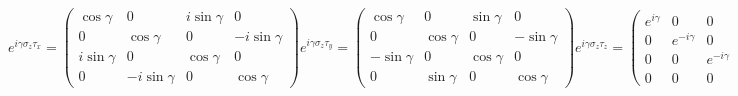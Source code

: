 \documentclass[12pt]{extarticle}
\begin{document}
\begin{equation*}
e^{i\gamma\sigma_z\tau_x}=
\begin{pmatrix}
    \cos\gamma & 0 & i\sin\gamma & 0 \\
    0 & \cos\gamma & 0 & -i\sin\gamma \\
    i\sin\gamma & 0 & \cos\gamma & 0 \\
    0 & -i\sin\gamma & 0 & \cos\gamma
\end{pmatrix}
e^{i\gamma\sigma_z\tau_y}=
\begin{pmatrix}
    \cos\gamma & 0 & \sin\gamma & 0 \\
    0 & \cos\gamma & 0 & -\sin\gamma \\
    -\sin\gamma & 0 & \cos\gamma & 0 \\
    0 & \sin\gamma & 0 & \cos\gamma
\end{pmatrix}
e^{i\gamma\sigma_z\tau_z}=
\begin{pmatrix}
    e^{i\gamma} & 0 & 0 & 0 \\
    0 & e^{-i\gamma} & 0 & 0 \\
    0 & 0 & e^{-i\gamma} & 0 \\
    0 & 0 & 0 & e^{i\gamma}
\end{pmatrix}
\end{equation*}
\normalsize

\appendix
\end{document}

